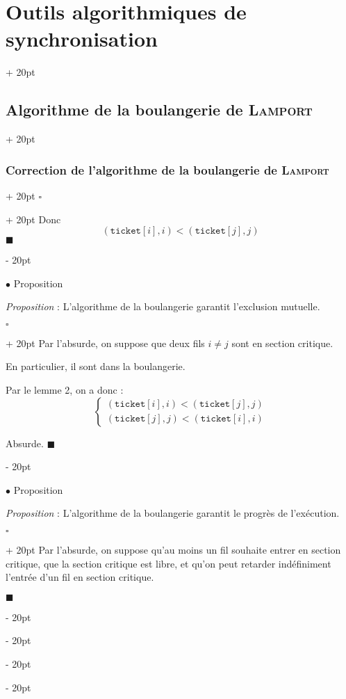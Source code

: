 \documentclass[a4paper, 12pt, twoside]{article}
\newcommand{\ind}[1][20pt]{\advance\leftskip + #1}
\newcommand{\deind}[1][20pt]{\advance\leftskip - #1}
\newenvironment{indt}[2][20pt]{#2 \par \ind[#1]}{\par \deind} %
\newenvironment{proof}[1][{}]{\begin{indt}{$\square$ #1}}{$\blacksquare$ \end{indt}}
\begin{document}
\begin{indt}{\section{Outils algorithmiques de synchronisation}}
\begin{indt}{\subsection{Algorithme de la boulangerie de \textsc{Lamport}}}
\begin{indt}{\subsubsection{Correction de l'algorithme de la boulangerie de \textsc{Lamport}}}
\begin{proof}
                    Donc
                    \[
                        (\mathtt{ticket}[i], i) < (\mathtt{ticket}[j], j)
                    \]
                \end{proof}

                \vspace{12pt}
                
                $\bullet$ Proposition

                \begin{emphBox}
                    \textit{Proposition} :
                    L'algorithme de la boulangerie garantit l'exclusion mutuelle.
                \end{emphBox}

                \vspace{6pt}
                
                \begin{proof}
                    Par l'absurde, on suppose que deux fils $i \neq j$ sont en section critique.

                    En particulier, il sont dans la boulangerie.

                    Par le lemme 2, on a donc :
                    \[
                        \begin{cases}
                            (\mathtt{ticket}[i], i) < (\mathtt{ticket}[j], j)
                            \\
                            (\mathtt{ticket}[j], j) < (\mathtt{ticket}[i], i)
                        \end{cases}
                    \]

                    Absurde.
                \end{proof}

                \vspace{12pt}
                
                $\bullet$ Proposition

                \begin{emphBox}
                    \textit{Proposition} :
                    L'algorithme de la boulangerie garantit le progrès de l'exécution.
                \end{emphBox}

                \vspace{12pt}
                
                \begin{proof}
                    Par l'absurde, on suppose qu'au moins un fil souhaite entrer en section critique, que la section critique est libre, et qu'on peut retarder indéfiniment l'entrée d'un fil en section critique.


\end{proof}
\end{indt}
\end{indt}
\end{indt}
\end{document}
